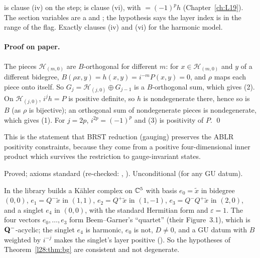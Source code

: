 \begin{dictionary}
 is clause (iv) on the step;  is clause (vi), with
$=(-1)^ph$ (Chapter~\ref{ch:L19}). The section variables are a  and ; the hypothesis
 says the layer index is in the range of the flag. Exactly clauses (iv) and (vi) for the harmonic model.
\end{dictionary}

\paragraph{Proof on paper.} The pieces $\mathcal H_{(m,0)}$ are $B$-orthogonal for different $m$: for $x\in\mathcal H_{(m,0)}$ and $y$ of a different
bidegree, $B(\rho x,y)=h(x,y)=i^{-m}P(x,y)=0$, and $\rho$ maps each piece onto itself. So $G_j=\mathcal H_{(j,0)}\oplus G_{j-1}$ is a $B$-orthogonal sum, which gives (2). On
$\mathcal H_{(j,0)}$, $i^jh=P$ is positive definite, so $h$ is nondegenerate there, hence so is $B$ (as $\rho$ is bijective); an orthogonal sum
of nondegenerate pieces is nondegenerate, which gives (1). For $j=2p$, $i^{2p}=(-1)^p$ and (3) is positivity of $P$. \qed

\begin{physics}
This is the statement that BRST reduction (gauging) preserves the ABLR positivity constraints, because they come from a positive
four-dimensional inner product which survives the restriction to gauge-invariant states.
\end{physics}

\begin{status}
Proved; axioms standard (re-checked: , ). Unconditional (for any GU datum).
\end{status}

\begin{example}\label{l28:ex:quartet}
In  the library builds a Kähler complex on ${\mathbb{C}}^5$ with basis $e_0=\tilde x$ in bidegree $(0,0)$,
$e_1=Q^-\tilde x$ in $(1,1)$, $e_2=Q^+\tilde x$ in $(1,-1)$, $e_3=Q^-Q^+\tilde x$ in $(2,0)$, and a singlet $e_4$ in $(0,0)$, with the standard
Hermitian form and $\varepsilon=1$. The four vectors $e_0,\dots,e_3$ form Beem--Garner's ``quartet'' (their Figure~3.1), which is
$\mathbf Q^-$-acyclic; the singlet $e_4$ is harmonic, $e_0$ is not, $D\neq0$, and a GU datum with $B$ weighted by $i^{-j}$ makes the
singlet's layer positive (). So the hypotheses of Theorem~\ref{l28:thm:bg} are consistent and not degenerate.
\end{example}

